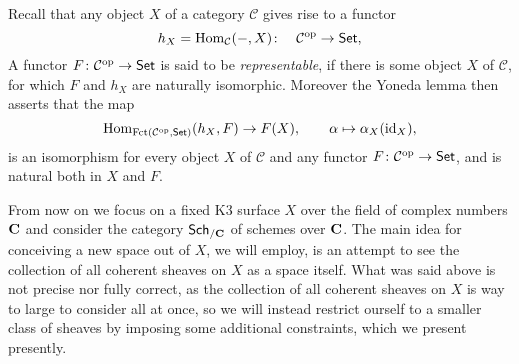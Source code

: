 
Recall that any object $X$ of a category $\mathcal C$ gives rise to a functor 
\[
    h_X = \operatorname{Hom}_{\mathcal C}(-, X) \colon  \quad \mathcal C^{\text{op}} \to \mathsf{Set},
\]
A functor $F \colon \mathcal C^{\text{op}} \to \mathsf{Set}$ is said to be \emph{representable}, if there is some object $X$ of $\mathcal C$, for which $F$ and $h_X$ are naturally isomorphic. Moreover the Yoneda lemma \cite[text]{keylist} then asserts that the map  
\begin{equation}
    \label{eq: nat iso of Yoneda}
    \operatorname{Hom}_{\operatorname{Fct(\mathcal C^{\text{op}}, \mathsf{Set})}}(h_X, F) \to F(X), \qquad \alpha \mapsto \alpha_X(\operatorname{id}_{X}),
\end{equation}
is an isomorphism for every object $X$ of $\mathcal C$ and any functor $F \colon \mathcal C ^{\text{op}} \to \mathsf{Set}$, and is natural both in $X$ and $F$.

From now on we focus on a fixed K3 surface $X$ over the field of complex numbers $\mathbf C$ and consider the category $\mathsf{Sch}_{/\mathbf C}$ of schemes over $\mathbf C$. The main idea for conceiving a new space out of $X$, we will employ, is an attempt to see the collection of all coherent sheaves on $X$ as a space itself. What was said above is not precise nor fully correct, as the collection of all coherent sheaves on $X$ is way to large to consider all at once, so we will instead restrict ourself to a smaller class of sheaves by imposing some additional constraints, which we present presently. 

